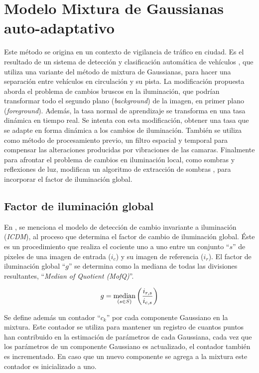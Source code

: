 \section{Modelo Mixtura de Gaussianas auto-adaptativo}

Este método se origina en un contexto de vigilancia de tráfico en ciudad. Es el resultado de un sistema de detección y clasificación automática de vehículos \cite{chen_vehicle_2012}, que utiliza una variante del método de mixtura de Gaussianas\cite{zivkovic_efficient_2006}, para hacer una separación entre vehículos en circulación y su pista. La modificación propuesta aborda el problema de cambios bruscos en la iluminación, que podrían transformar todo el segundo plano (\textit{background}) de la imagen, en primer plano (\textit{foreground}). Además, la tasa normal de aprendizaje se transforma en una tasa dinámica en tiempo real. Se intenta con esta modificación, obtener una tasa que se adapte en forma dinámica a los cambios de iluminación. También se utiliza como método de procesamiento previo, un filtro espacial y temporal\cite{chen_background_2009} para compensar las alteraciones producidas por vibraciones de las camaras. Finalmente para afrontar el problema de cambios en iluminación local, como sombras y reflexiones de luz, modifican un algoritmo de extracción de sombras \cite{horprasert_astatistical_1999}, para incorporar el factor de iluminación global.


\subsection{Factor de iluminación global}
En \cite{chen_self-adaptive_2011}, se menciona el modelo de detección de cambio invariante a iluminación (\textit{ICDM}), al proceso que determina el factor de cambio de iluminación global.  Éste es un procedimiento que realiza el cociente uno a uno entre un conjunto ``$s$'' de pixeles de una imagen de entrada ($i_c$) y su imagen de referencia ($i_r$). El factor de iluminación global ``$g$'' se determina como la mediana de todas las divisiones resultantes, ``\textit{Median of Quotient (MofQ)}''.

\begin{equation} \label{eq:mofq}
g = \operatorname*{median}_{(s \in S)}  \left(\frac{i_{r,s}}{i_{c,s}}\right)
\end{equation}

Se define además un contador ``$c_k$'' por cada componente Gaussiano en la mixtura. Este contador se utiliza para mantener un registro de cuantos puntos han contribuido en la estimación de parámetros de cada Gaussiana, cada vez que los parámetros de un componente Gaussiano es actualizado, el contador también es incrementado. En caso que un nuevo componente se agrega a la mixtura este contador es inicializado a uno. 

